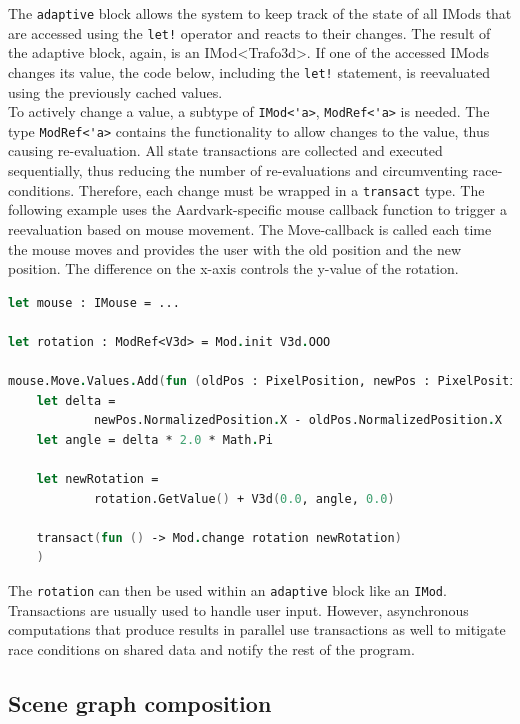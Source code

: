 The \verb|adaptive| block allows the system to keep track of the state of all IMods that are accessed using the \verb|let!| operator and reacts to their changes. The result of the adaptive block, again, is an IMod<Trafo3d>. If one of the accessed IMods changes its value, the code below, including the \verb|let!| statement, is reevaluated using the previously cached values. 
\\

To actively change a value, a subtype of \verb|IMod<'a>|, \verb|ModRef<'a>| is needed. The type \verb|ModRef<'a>| contains the functionality to allow changes to the value, thus causing re-evaluation. All state transactions are collected and executed sequentially, thus reducing the number of re-evaluations and circumventing race-conditions. Therefore, each change must be wrapped in a \verb|transact| type. 
The following example uses the Aardvark-specific mouse callback function to trigger a reevaluation based on mouse movement. The Move-callback is called each time the mouse moves and provides the user with the old position and the new position. The difference on the x-axis controls the y-value of the rotation. 

\begin{lstlisting}[language = FSharp]
let mouse : IMouse = ...

let rotation : ModRef<V3d> = Mod.init V3d.OOO

mouse.Move.Values.Add(fun (oldPos : PixelPosition, newPos : PixelPosition) -> 
    let delta = 
            newPos.NormalizedPosition.X - oldPos.NormalizedPosition.X
    let angle = delta * 2.0 * Math.Pi
    
    let newRotation = 
            rotation.GetValue() + V3d(0.0, angle, 0.0)
    
    transact(fun () -> Mod.change rotation newRotation)
    )
\end{lstlisting}

The \verb|rotation| can then be used within an \verb|adaptive| block like an \verb|IMod|. 
\\
Transactions are usually used to handle user input. However, asynchronous computations that produce results in parallel use transactions as well to mitigate race conditions on shared data and notify the rest of the program. 


\subsection{Scene graph composition}
\label{sec:isg}

